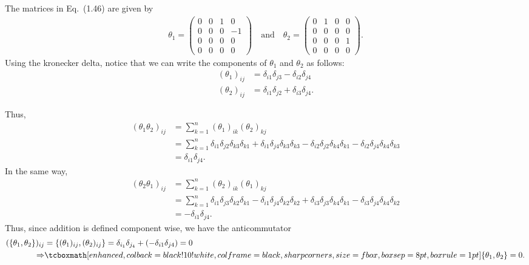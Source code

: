 
The matrices in Eq.~(1.46) are given by
\begin{eqnarray}
    \label{eq:matrices-1.46}
    \theta_1 = 
    \begin{pmatrix}
    0 & 0 & 1 & 0 \\
    0 & 0 & 0 & -1 \\
    0 & 0 & 0 & 0 \\
    0 & 0 & 0 & 0
    \end{pmatrix}
    \quad
    \mbox{and}
    \quad
    \theta_2 = 
    \begin{pmatrix}
        0 & 1 & 0 & 0 \\
        0 & 0 & 0 & 0 \\
        0 & 0 & 0 & 1 \\
        0 & 0 & 0 & 0
    \end{pmatrix}
.\end{eqnarray}
Using the kronecker delta, notice that we can write the components of $\theta_1$ and $\theta_2$ as follows:
\begin{align}
    \label{eq:components-th12}
    (\theta_1)_{ij} &= \delta_{i 1}\delta_{j 3} - \delta_{i 2}\delta_{j 4} \\
    (\theta_2)_{ij} &= \delta_{i 1}\delta_{j 2} + \delta_{i 3}\delta_{j 4}
.\end{align}

Thus,
\begin{align}
    \label{eq:th1-th2-prod}
    (\theta_1\theta_2)_{ij} &= \sum_{k=1}^{n} (\theta_1)_{ik}(\theta_2)_{kj} \\
                            &= \sum_{k=1}^{n} \delta_{i 1}\delta_{j 2}\delta_{k 3}\delta_{k 1} + \delta_{i 1}\delta_{j 4}\delta_{k 3}\delta_{k 3} - \delta_{i 2}\delta_{j 2}\delta_{k 4}\delta_{k 1} - \delta_{i 2}\delta_{j 4}\delta_{k 4}\delta_{k 3} \\
                            &= \delta_{i 1}\delta_{j 4}
.\end{align}
In the same way,
\begin{align}
    \label{eq:th2-th1-prod}
    (\theta_2\theta_1)_{ij} &= \sum_{k=1}^{n} (\theta_2)_{ik}(\theta_1)_{kj} \\
                            &= \sum_{k=1}^{n} \delta_{i 1}\delta_{j 3}\delta_{k 2}\delta_{k 1} - \delta_{i 1}\delta_{j 4}\delta_{k 2}\delta_{k 2} + \delta_{i 3}\delta_{j 3}\delta_{k 4}\delta_{k 1} - \delta_{i 3}\delta_{j 4}\delta_{k 4}\delta_{k 2} \\
                            &= -\delta_{i 1}\delta_{j 4}
.\end{align}
Thus, since addition is defined component wise, we have the anticommutator
\begin{align}
    \label{eq:anticommutator}
    (\{\theta_1,\theta_2\})_{ij} &= \{(\theta_1)_{ij},(\theta_2)_{ij}\} = \delta_{i_1}\delta_{j_4} + (-\delta_{i 1}\delta_{j 4}) = 0 \\
    \Rightarrow& \eqbox{\{\theta_1,\theta_2\} = 0}
.\end{align}


